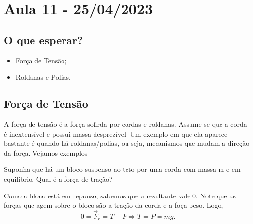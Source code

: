 \documentclass[PhysicsI/physics_notes.tex]{subfiles}
\begin{document}
\section{Aula 11 - 25/04/2023}
\subsection{O que esperar?}
\begin{itemize}
	\item Força de Tensão;
	\item Roldanas e Polias.
\end{itemize}

\subsection{Força de Tensão}
A força de tensão é a força sofirda por cordas e roldanas. Assume-se que a corda é inextensível e possui massa
desprezível. Um exemplo em que ela aparece bastante é quando há roldanas/polias, ou seja, mecanismos que mudam a direção
da força. Vejamos exemplos
\begin{example}
	Suponha que há um bloco suspenso ao teto por uma corda com massa m e em equilíbrio. Qual é a força de tração?

	Como o bloco está em repouso, sabemos que a resultante vale 0. Note que as forças que agem sobre o bloco são a tração
	da corda e a foça peso. Logo,
	$$
		0 = \vec{F}_{r} = T - P \Rightarrow T = P = mg.
	$$
\end{example}
\end{document}
